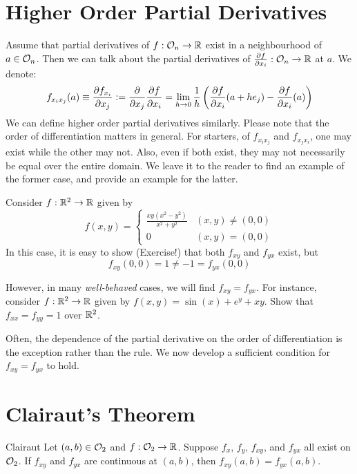 \documentclass[../Analysis-3.tex]{subfiles}
\begin{document}
\section{Higher Order Partial Derivatives}

Assume that partial derivatives of $f: \mathcal{O}_{n} \to \mathbb{R}$ exist in a neighbourhood of $a \in \mathcal{O}_{n} $. Then we can talk about the partial derivatives of $\pdv{f}{x_i}: \mathcal{O}_{n} \to \mathbb{R}$ at $a$. We denote:
\[f_{x_i x_j}(a) \equiv \pdv{f_{x_i}}{x_j} \mathrel{\mathop:}= \pdv{x_j} \pdv{f}{x_i} = \lim_{h \to 0} \frac{1}{h} \left( \pdv{f}{x_i}\/(a+h e_j)- \pdv{f}{x_i}\/ (a) \right)
\]
We can define higher order partial derivatives similarly. Please note that the order of differentiation matters in general. For starters, of  $f_{x_i x_j}$ and $f_{x_j x_i}$, one may exist while the other may not. Also, even if both exist, they may not necessarily be equal over the entire domain. We leave it to the reader to find an example of the former case, and provide an example for the latter.

\begin{Eg}{}{}
  Consider $f: \mathbb{R}^2 \to \mathbb{R}$ given by
  \[
    f(x,y) =
    \begin{cases}
      \frac{xy(x^2 - y^2)}{x^2 + y^2} & (x,y) \neq (0,0) \\
      0                               & (x,y) = (0,0)
    \end{cases}
  \]
  In this case, it is easy to show (Exercise!) that both $f_{xy}$ and $f_{yx}$ exist, but
  \[f_{xy}(0,0) = 1 \neq -1 = f_{yx}(0,0)\]
\end{Eg}

\begin{Eg}{}{}
  However, in many \emph{well-behaved} cases, we will find $f_{xy} = f_{yx}$.
  For instance, consider $f: \mathbb{R}^2 \to \mathbb{R}$ given by $f(x,y) = \sin(x) + e^y + xy$. Show that $f_{xx} = f_{yy} = 1$ over $\mathbb{R}^2$.
\end{Eg}

Often, the dependence of the partial derivative on the order of differentiation is the exception rather than the rule. We now develop a sufficient condition for $f_{xy} = f_{yx}$ to hold.

\section{Clairaut's Theorem}

\begin{Thm}{Clairaut}{}\label{thm1:19}
  Let $(a,b) \in \mathcal{O}_{2}$ and $f:\mathcal{O}_{2} \to \mathbb{R}$. Suppose $f_x$, $f_y$, $f_{xy}$, and $f_{yx}$ all exist on $\mathcal{O}_{2}$. If $f_{xy}$ and $f_{yx}$ are continuous at $(a,b)$, then $f_{xy}(a,b) = f_{yx}(a,b)$.
\end{Thm}
\end{document}
